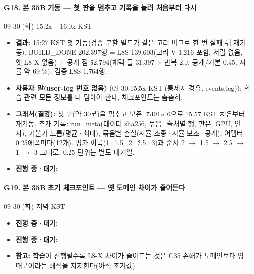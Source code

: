 \paragraph{G18. 본 35B 기동 --- 첫 판을 멈추고 기록을 늘려 처음부터 다시}
{\small 09-30 (화) 15:2x -- 16:0x KST}
\begin{itemize}
  \item \textbf{결과:} 15:27 KST 첫 기동(검증 분할 빌드가 같은 고리 버그로 한 번 실패 뒤 재기동). BUILD\_DONE 202,397행 = L8S 139,603(고리 V 1,216 포함, 서랍 없음, 옛 L8-X 없음) + 공개 점 62,794(채택 풀 31,397 $\times$ 반복 2.0, 공개/기본 0.45, 시뮬 약 69 \%). 검증 L8S 1,764행.
  \item \textbf{사용자 말(user-log 번호 없음)} (09-30 15:5x KST (통제자 경유, events.log)): 학습 관련 모든 정보를 다 담아야 한다, 체크포인트는 촘촘히.
  \item \textbf{그래서(결정):} 첫 판(약 30분)을 멈추고 보존, 7d91cd6으로 15:57 KST 처음부터 재기동. 추가 기록: run\_meta(데이터 sha256, 묶음·출처별 행, 판본, GPU, 인자), 기울기 노름(평균·최대), 묶음별 손실(시뮬 조종·시뮬 보조·공개), 어댑터 0.25에폭마다(12개). 평가 이름(1·1.5·2·2.5·3)과 순서 2 $\rightarrow$ 1.5 $\rightarrow$ 2.5 $\rightarrow$ 1 $\rightarrow$ 3 그대로, 0.25 단위는 별도 대기열.
  \item \textbf{진행 중·대기:} 
\end{itemize}

\paragraph{G19. 본 35B 초기 체크포인트 --- 옛 도메인 차이가 줄어든다}
{\small 09-30 (화) 저녁 KST}
\begin{itemize}
  \item \textbf{진행 중·대기:} 
  \item \textbf{진행 중·대기:} 
  \item \textbf{참고:} 학습이 진행될수록 L8-X 차이가 줄어드는 것은 C35 손해가 도메인보다 양 때문이라는 해석을 지지한다(아직 초기값).
\end{itemize}

